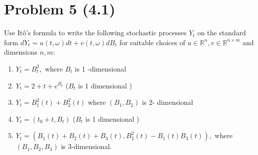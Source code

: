 \documentclass[11pt]{article}
\begin{document}
 \section*{Problem 5 (4.1)}
 Use It\^o's formula to write the following stochastic processes $Y _ { t }$ on the standard form $d Y _ { t } = u ( t , \omega ) d t + v ( t , \omega ) d B _ { t }$ for suitable choices of $u \in \mathbb { R } ^ { n } , v \in \mathbb { R } ^ { n \times m }$ and dimensions $n , m :$
 \begin{enumerate}
 \item $Y _ { t } = B _ { t } ^ { 2 } ,$ where $B _ { t }$ is 1 -dimensional
 \item $Y _ { t } = 2 + t + e ^ { B _ { t } }$ ($ B _ { t }$ is 1 dimensional ) 
 \item $Y _ { t } = B _ { 1 } ^ { 2 } ( t ) + B _ { 2 } ^ { 2 } ( t )$ where $\left( B _ { 1 } , B _ { 2 } \right)$ is $2$- dimensional
 \item $Y _ { t } = \left( t _ { 0 } + t , B _ { t } \right) $ ($ B _ { t }$ is 1 dimensional )
 \item $Y _ { t } = \left( B _ { 1 } ( t ) + B _ { 2 } ( t ) + B _ { 3 } ( t ) , B _ { 2 } ^ { 2 } ( t ) - B _ { 1 } ( t ) B _ { 3 } ( t ) \right) ,$ where $\left( B _ { 1 } , B _ { 2 } , B _ { 3 } \right)$ is 3-dimensional.
 \end{enumerate}
\end{document}
